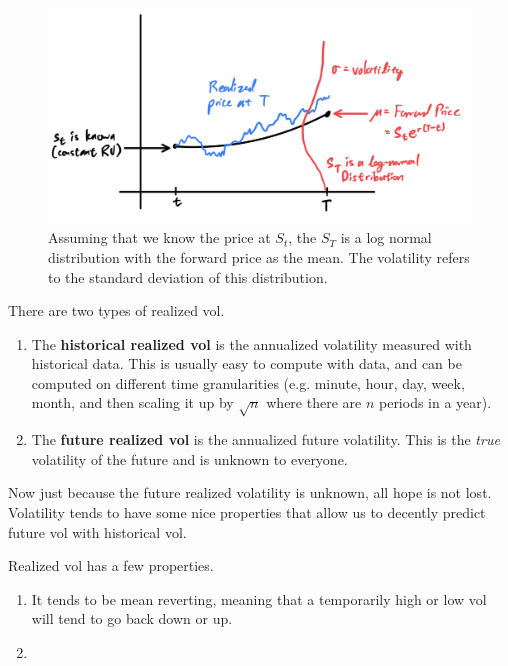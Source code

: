 \documentclass{article}
\begin{document}
    \begin{figure}[H]
      \centering 
      \includegraphics[scale=0.5]{img/distribution_of_S_T.png}
      \caption{Assuming that we know the price at $S_t$, the $S_T$ is a log normal distribution with the forward price as the mean. The volatility refers to the standard deviation of this distribution. } 
      \label{fig:distribution_of_S_T}
    \end{figure}

    \begin{definition}
      There are two types of realized vol. 
      \begin{enumerate}
        \item The \textbf{historical realized vol} is the annualized volatility measured with historical data. This is usually easy to compute with data, and can be computed on different time granularities (e.g. minute, hour, day, week, month, and then scaling it up by $\sqrt{n}$ where there are $n$ periods in a year). 
        \item The \textbf{future realized vol} is the annualized future volatility. This is the \textit{true} volatility of the future and is unknown to everyone. 
      \end{enumerate}
    \end{definition}

    Now just because the future realized volatility is unknown, all hope is not lost. Volatility tends to have some nice properties that allow us to decently predict future vol with historical vol. 

    \begin{theorem}
      Realized vol has a few properties. 
      \begin{enumerate}
        \item It tends to be mean reverting, meaning that a temporarily high or low vol will tend to go back down or up. 
        \item 
      \end{enumerate}
    \end{theorem}
\end{document}

